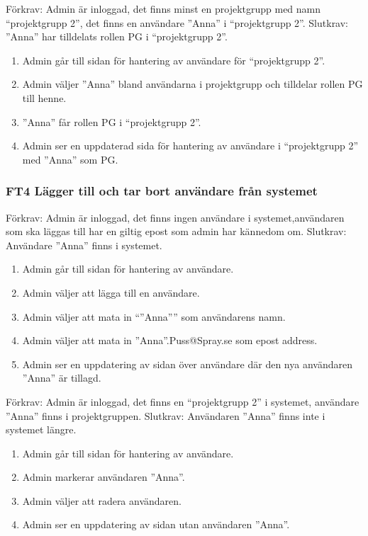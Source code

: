 \documentclass[paper=a4, fontsize=11pt,twoside]{article}
\begin{document}
	Förkrav: Admin är inloggad, det finns minst en projektgrupp med namn
	“projektgrupp 2”, det finns en användare ”Anna” i “projektgrupp 2”.
	\newline
	Slutkrav: ”Anna” har tilldelats rollen PG i “projektgrupp 2”.
 	
 	\begin{enumerate}
	\item Admin går till sidan för hantering av användare för “projektgrupp 2”.
	\item Admin väljer ”Anna” bland användarna i projektgrupp  och tilldelar rollen
	PG till henne.
	\item ”Anna” får rollen PG i “projektgrupp 2”.
	\item Admin ser en uppdaterad sida för hantering av användare i “projektgrupp 2” med ”Anna” som PG.
		
	\end{enumerate}
	
	\subsubsection*{FT4 Lägger till och tar bort användare från systemet}
	
	Förkrav: Admin är inloggad, det finns ingen användare i systemet,användaren som
	ska läggas till har en giltig epost som admin har kännedom om.
	\newline
	Slutkrav: Användare ”Anna” finns i systemet.
	
	\begin{enumerate}
	  \item Admin går till sidan för hantering av användare.
	  \item Admin väljer att lägga till en användare.
	  \item Admin väljer att mata in “”Anna”” som användarens namn.
	  \item Admin väljer att mata in  ”Anna”.Puss@Spray.se som epost address.
		\item Admin ser en uppdatering av sidan över användare där den nya användaren
		”Anna” är tillagd.
	\end{enumerate}
	
	Förkrav: Admin är inloggad, det finns en “projektgrupp 2” i systemet, användare 
	”Anna” finns i projektgruppen.
	\newline
	Slutkrav: Användaren ”Anna” finns inte i systemet längre.
	
	\begin{enumerate}
	 \item Admin går till sidan för hantering av användare.
   \item Admin markerar användaren ”Anna”.
   \item Admin väljer att radera användaren.
   \item Admin ser en uppdatering av sidan utan användaren ”Anna”.
	  
	\end{enumerate}
	
\end{document}
